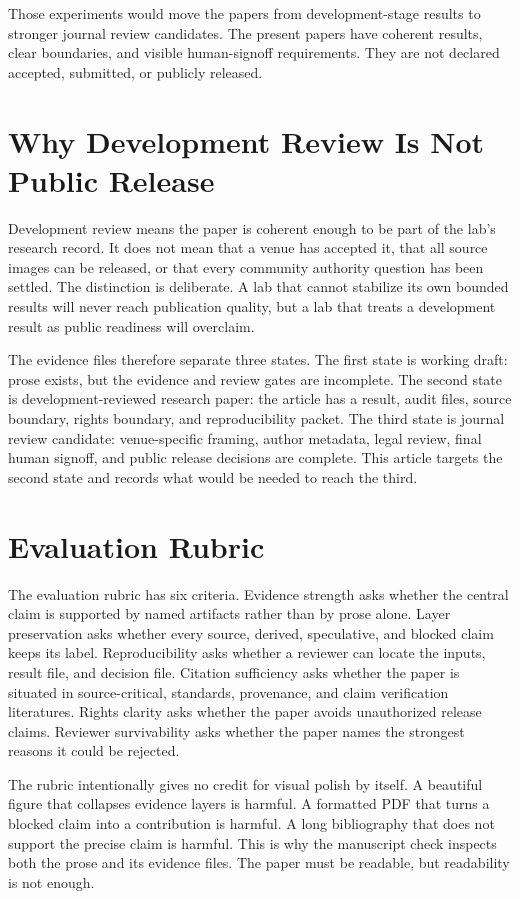\documentclass[sigconf,nonacm]{acmart}
\begin{document}
Those experiments would move the papers from development-stage results to
stronger journal review candidates. The present papers have coherent results,
clear boundaries, and visible human-signoff requirements. They are not declared
accepted, submitted, or publicly released.

\section{Why Development Review Is Not Public Release}
Development review means the paper is coherent enough to be part of the lab's
research record. It does not mean that a venue has accepted it, that all source
images can be released, or that every community authority question has been
settled. The distinction is deliberate. A lab that cannot stabilize its own
bounded results will never reach publication quality, but a lab that treats a
development result as public readiness will overclaim.

The evidence files therefore separate three states. The first state is working
draft: prose exists, but the evidence and review gates are incomplete. The
second state is development-reviewed research paper: the article has a result,
audit files, source boundary, rights boundary, and reproducibility packet. The
third state is journal review candidate: venue-specific framing, author
metadata, legal review, final human signoff, and public release decisions are
complete. This article targets the second state and records what would be needed
to reach the third.

\section{Evaluation Rubric}
The evaluation rubric has six criteria. Evidence strength asks whether the
central claim is supported by named artifacts rather than by prose alone.
Layer preservation asks whether every source, derived, speculative, and blocked
claim keeps its label. Reproducibility asks whether a reviewer can locate the
inputs, result file, and decision file. Citation sufficiency asks whether the
paper is situated in source-critical, standards, provenance, and claim
verification literatures. Rights clarity asks whether the paper avoids
unauthorized release claims. Reviewer survivability asks whether the paper names
the strongest reasons it could be rejected.

The rubric intentionally gives no credit for visual polish by itself. A
beautiful figure that collapses evidence layers is harmful. A formatted PDF that
turns a blocked claim into a contribution is harmful. A long bibliography that
does not support the precise claim is harmful. This is why the manuscript check
inspects both the prose and its evidence files. The paper must be readable, but
readability is not enough.
\end{document}
